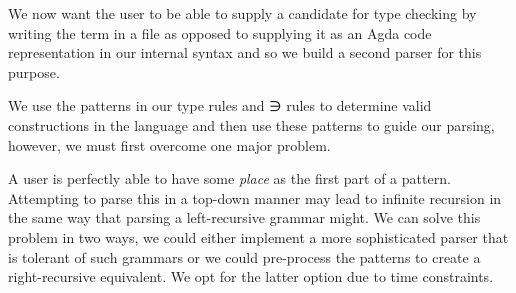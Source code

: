 {\begin{code}
\AgdaSymbol{)}\<%
\\
\>[0]\AgdaSpace{}%
\AgdaSpace{}%
\AgdaSpace{}%
\AgdaSpace{}%
\AgdaSymbol{(}\AgdaSymbol{;}\AgdaSpace{}%
\AgdaSymbol{;}\AgdaSpace{}%
\AgdaSymbol{)}\<%
\\
\>[0]\AgdaSpace{}%
\AgdaSpace{}%
\AgdaSpace{}%
\AgdaSymbol{(}\AgdaSpace{}%
\AgdaSpace{}%
\AgdaSymbol{)}\<%
\\
\>[0]\AgdaSpace{}%
\AgdaSpace{}%
\AgdaSpace{}%
\AgdaSymbol{(}\AgdaSpace{}%
\AgdaSpace{}%
\AgdaSymbol{)}\<%
\\
\>[0]\AgdaSpace{}%
\AgdaSpace{}%
\AgdaSpace{}%
\AgdaSymbol{(}\AgdaSymbol{)}\<%
\\
\>[0]\AgdaSpace{}%
\AgdaSpace{}%
\AgdaSpace{}%
\AgdaSpace{}%
\AgdaSymbol{(}\AgdaSymbol{;}\AgdaSpace{}%
\AgdaSymbol{)}\<%
\end{code}
}
We now want the user to be able to supply a candidate for type checking by
writing the term in a file as opposed to supplying it as an Agda code
representation in our internal syntax and so we build a second parser for this
purpose.

We use the patterns in our type rules and ∋ rules to determine valid
constructions in the language and then use these patterns to guide our parsing,
however, we must first overcome one major problem.

A user is perfectly able to have some \emph{place} as the first part of a pattern.
Attempting to parse this in a top-down manner may lead to infinite recursion in
the same way that parsing a left-recursive grammar might. We can solve this problem
in two ways, we could either implement a more sophisticated parser that is tolerant
of such grammars or we could pre-process the patterns to create a right-recursive
equivalent. We opt for the latter option due to time constraints.

